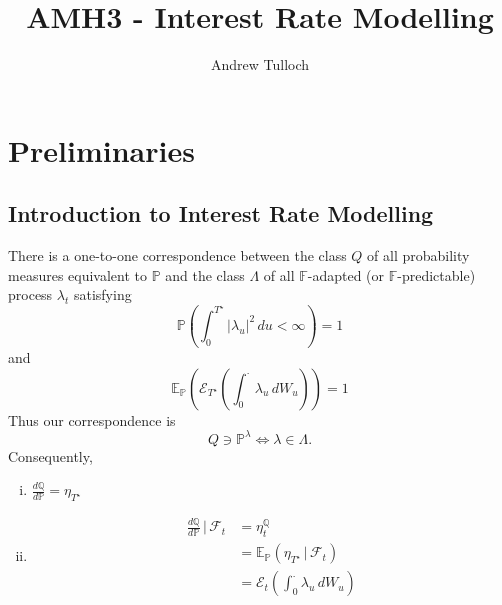 \documentclass[10pt, oneside, reqno]{amsbook}
\title{AMH3 - Interest Rate Modelling}								%
\author{Andrew Tulloch}
\theoremstyle{plain}%
\theoremstyle{definition}
\theoremstyle{remark}
\newcommand{\given}{ \, | \,}
\newcommand{\sigf}{\mathcal{F}}
\newcommand{\Q}{\mathbb{Q}}
\newcommand{\E}{\mathbb{E}}
\renewcommand{\P}{\mathbb{P}}
\newcommand{\F}{\mathbb{F}}
\newcommand{\doleans}[1]{\mathcal E_t \left(\int_0^\cdot #1 \right)}
\numberwithin{equation}{chapter}
\begin{document}

\maketitle

\tableofcontents

\chapter{Preliminaries} %
\label{cha:preliminaries}

\section{Introduction to Interest Rate Modelling} %
\label{sec:introduction_to_interest_rate_modelling}

There is a one-to-one correspondence between the class $Q$ of all probability measures equivalent to $\P$ and the class $\Lambda$ of all $\F$-adapted (or $\F$-predictable) process $\lambda_t$ satisfying \[
	\P\left(\int_0^{T^\star} |\lambda_u|^2 \, du < \infty \right) = 1
\]
and \[
	\E_\P\left( \mathcal{E}_{T^\star} \left(\int_0^\cdot \lambda_u \, dW_u\right) \right) = 1
\] 
Thus our correspondence is \[Q \ni \P^\lambda \iff \lambda \in \Lambda.\]
Consequently, \begin{enumerate}[(i)]
	\item $\frac{d\Q}{d\P} = \eta_{T^\star}$
	\item \begin{align*}
		\frac{d\Q}{d\P} \given \sigf_t 	&= \eta^\Q_t \\
										&= \E_\P\left(\eta_{T^\star} \given \sigf_t \right) \\
										&= \doleans{\lambda_u \, dW_u}
	\end{align*}
\end{enumerate}
\end{document}
